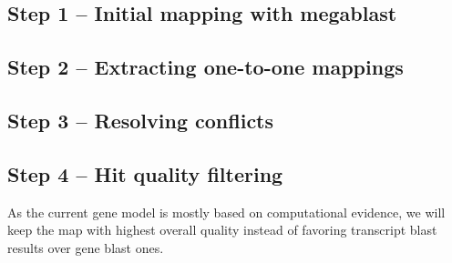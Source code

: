 \subsection{Step 1 – Initial mapping with megablast}

\subsection{Step 2 – Extracting one-to-one mappings}

\subsection{Step 3 – Resolving conflicts}\label{apd:magic-conflict}

\subsection{Step 4 – Hit quality filtering}


As the current gene model is mostly based on computational evidence, we will 
keep the map with highest overall quality instead of favoring transcript blast 
results over gene blast ones.




